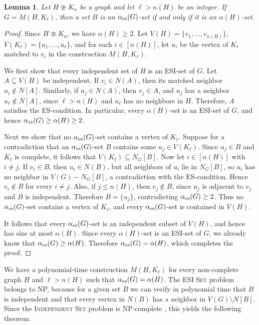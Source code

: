 \documentclass[11pt]{article}
\newtheorem{lemma}[theorem]{Lemma}
\newcommand{\es}{\alpha_{\rm es}}
\newcommand{\al}{\alpha}
\begin{document}
\begin{lemma} 
\label{lemma:M}
Let $H\ncong K_n$ be a graph and let $\ell>n(H)$ be an integer. If $G=M(H,K_{\ell})$, then a set $B$ is an $\es(G)$-set if and only if it is an $\al(H)$-set.   
\end{lemma}

\begin{proof}
Since $H\ncong K_n$, we have $\al(H)\geq 2$. 
Let $V(H)=\{v_1,\dots,v_{n(H)}\}$, $V(K_{\ell})=\{u_1,\dots,u_{\ell}\}$, and for each $i\in[n(H)]$, let $u_i$ be the vertex of $K_{\ell}$ matched to $v_i$ in the construction $M(H,K_{\ell})$.

We first show that every independent set of $H$ is an ESI-set of $G$. Let $A\subseteq V(H)$ be independent. If $v_i\in N(A)$, then its matched neighbor $u_i \notin N[A]$. Similarly, if $u_j\in N(A)$, then $v_j\in A$, and $u_j$ has a neighbor $u_{\ell}\notin N[A]$, since $\ell>n(H)$ and $u_{\ell}$ has no neighbors in $H$.
Therefore, $A$ satisfies the ES-condition. In particular, every $\al(H)$-set is an ESI-set of $G$, and hence $\es(G)\ge \al(H) \ge 2$.

Next we show that no $\es(G)$-set contains a vertex of $K_{\ell}$. Suppose for a contradiction that an $\es(G)$-set $B$ contains some $u_j\in V(K_{\ell})$. Since $u_j\in B$ and $K_{\ell}$ is complete, it follows that $V(K_{\ell})\subseteq N_G[B]$.
Now let $i\in[n(H)]$ with $i\neq j$. If $v_i\in B$, then $u_i\in N(B)$, but all neighbors of $u_i$ lie in $N_G[B]$, so $u_i$ has no neighbor in $V(G)-N_G[B]$, a contradiction with the ES-condition. Hence $v_i\notin B$ for every $i\neq j$. Also, if $j\leq n(H)$, then $v_j\notin B$, since $u_j$ is adjacent to $v_j$ and $B$ is independent. Therefore $B=\{u_j\}$, contradicting $\es(G)\ge 2$. Thus no $\es(G)$-set contains a vertex of $K_{\ell}$, and every $\es(G)$-set is contained in $V(H)$.

It follows that every $\es(G)$-set is an independent subset of $V(H)$, and hence has size at most $\al(H)$. Since every $\al(H)$-set is an ESI-set of $G$, we already know that $\es(G)\ge \al(H)$. Therefore $\es(G)=\al(H)$, which completes the proof.
\end{proof}

We have a polynomial-time construction $M(H,K_{\ell})$ for every non-complete graph $H$ and $\ell>n(H)$ such that $\es(G)=\al(H)$. 
The \textsc{ESI Set} problem belongs to NP, because for a given set $B$ we can verify in polynomial time that $B$ is independent and that every vertex in $N(B)$ has a neighbor in $V(G)\setminus N[B]$.
Since the \textsc{Independent Set} problem is NP-complete \cite{Garey}, this yields the following theorem.
\end{document}
